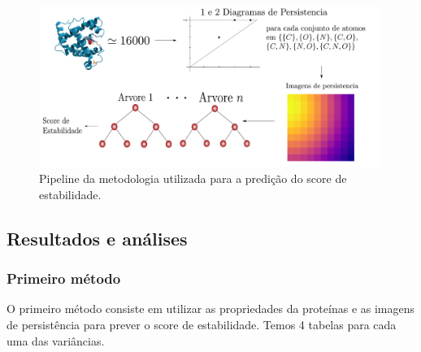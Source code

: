 \begin{figure}[!htpb] 
    \centering
    \includegraphics[width=0.99\textwidth]{images/proteinpipeline.pdf}
    \caption{Pipeline da metodologia utilizada para a predição do score de estabilidade.} 
    \label{fig:proteinpipeline}
    \fautor 
\end{figure}

\subsection{Resultados e análises} 
\subsubsection{Primeiro método}
O primeiro método consiste em utilizar as propriedades da proteínas e as imagens de 
persistência para prever o score de estabilidade. Temos 4 tabelas para cada uma das 
variâncias. 

